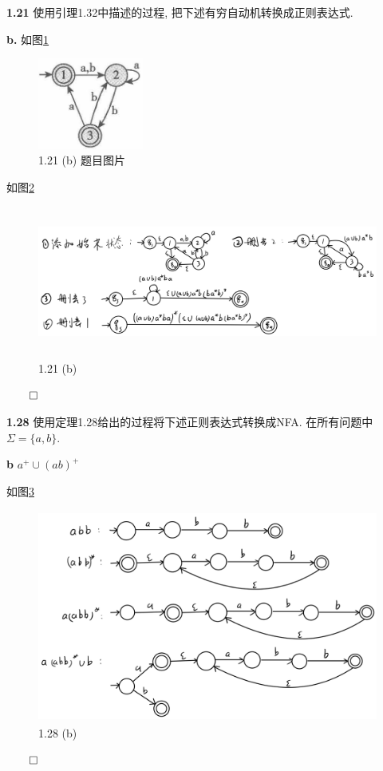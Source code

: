 \documentclass[UTF8]{report}
\newcommand{\problem}[1]{{\setlength{\parskip}{10pt}\noindent \bf{#1}}}
\renewenvironment{proof}{{\setlength{\parskip}{7pt}\noindent\hskip 2em \bf 证明 \quad}}{\hfill$\qed$\par}
\begin{document}
\problem{1.21} 使用引理1.32中描述的过程, 把下述有穷自动机转换成正则表达式.

\problem{b.} 如图\ref{fig:1_21b}

\begin{figure}[!htbp]
    \centering
    \includegraphics[height=3cm]{image/1.21 b.png}
    \caption{1.21 (b) 题目图片}
    \label{fig:1_21b}
\end{figure}

\begin{proof}
    如图\ref{fig:1_21}

    \begin{figure}[!htbp]
        \centering
        \includegraphics[height=5cm]{image/1.21.png}
        \caption{1.21 (b)}
        \label{fig:1_21}
    \end{figure}
\end{proof}


\problem{1.28} 使用定理1.28给出的过程将下述正则表达式转换成NFA. 在所有问题中 $\Sigma = \{ a,b \}$.

\problem{b} $a^+ \cup (ab)^+$

\begin{proof}
    如图\ref{fig:1_28}

    \begin{figure}[!htbp]
        \centering
        \includegraphics[height=7cm]{image/1.28.png}
        \caption{1.28 (b)}
        \label{fig:1_28}
    \end{figure}
\end{proof}
\end{document}
